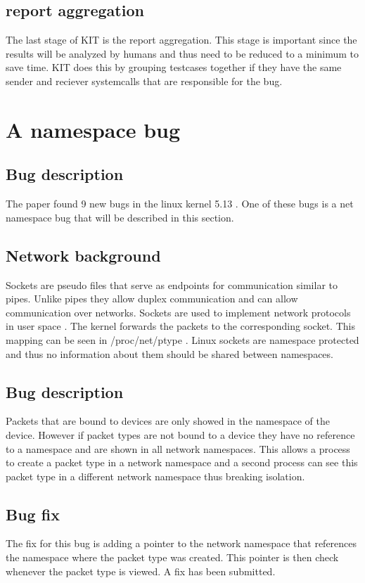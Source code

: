 \documentclass[10pt,twocolumn,a4paper]{article}
\begin{document}
\subsection{report aggregation}
The last stage of KIT is the report aggregation. This stage is important since the results will be
analyzed by humans and thus need to be reduced to a minimum to save time. KIT does this by grouping
testcases together if they have the same sender and reciever systemcalls that are responsible for
the bug. 
\section{A namespace bug}\label{sec:bug}
\subsection{Bug description}
The paper found 9 new bugs in the linux kernel 5.13 \cite{0}. One of these bugs is a net namespace
bug that will be described in this section. 

\subsection{Network background}
Sockets are pseudo files that serve as endpoints for communication similar to pipes. Unlike pipes
they allow duplex communication and can allow communication over networks\cite{5}. Sockets are
used to implement network protocols in user space \cite{5}. The kernel forwards the packets to the
corresponding socket. This mapping can be seen in /proc/net/ptype \cite{6}. Linux sockets are
namespace protected and thus no information about them should be shared between namespaces.

\subsection{Bug description}
Packets that are bound to devices are only showed in the namespace of the device. However if packet
types are not bound to a device they have no reference to a namespace and are shown in all network
namespaces. This allows a process to create a packet type in a network namespace and a second
process can see this packet type in a different network namespace thus breaking isolation.
\subsection{Bug fix}
The fix for this bug is adding a pointer to the network namespace that references the namespace
where the packet type was created. This pointer is then check whenever the packet type is
viewed. A fix has been submitted.\cite{4}
\end{document}
